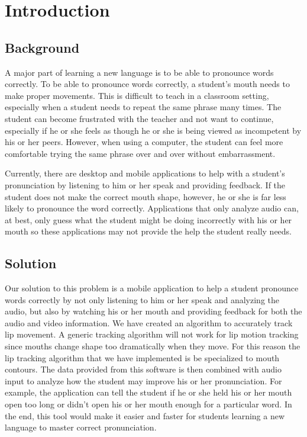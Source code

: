 \chapter{Introduction}

\section{Background}

A major part of learning a new language is to be able to pronounce words correctly. To be able to pronounce words correctly, a student's mouth needs to make proper movements. This is difficult to teach in a classroom setting, especially when a student needs to repeat the same phrase many times. The student can become frustrated with the teacher and not want to continue, especially if he or she feels as though he or she is being viewed as incompetent by his or her peers. However, when using a computer, the student can feel more comfortable trying the same phrase over and over without embarrassment.

Currently, there are desktop and mobile applications to help with a student's pronunciation by listening to him or her speak and providing feedback. If the student does not make the correct mouth shape, however, he or she is far less likely to pronounce the word correctly. Applications that only analyze audio can, at best, only guess what the student might be doing incorrectly with his or her mouth so these applications may not provide the help the student really needs.

\section{Solution}

Our solution to this problem is a mobile application to help a student pronounce words correctly by not only listening to him or her speak and analyzing the audio, but also by watching his or her mouth and providing feedback for both the audio and video information. We have created an algorithm to accurately track lip movement. A generic tracking algorithm will not work for lip motion tracking since mouths change shape too dramatically when they move. For this reason the lip tracking algorithm that we have implemented is be specialized to mouth contours. The data provided from this software is then combined with audio input to analyze how the student may improve his or her pronunciation. For example, the application can tell the student if he or she held his or her mouth open too long or didn't open his or her mouth enough for a particular word. In the end, this tool would make it easier and faster for students learning a new language to master correct pronunciation.
